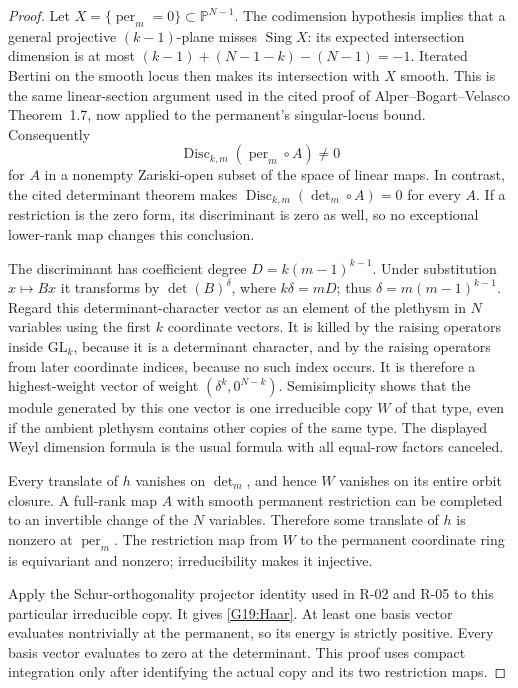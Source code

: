 \begin{proof}
Let $X=\{\operatorname{per}_m=0\}\subset\mathbb P^{N-1}$.
The codimension hypothesis implies that a general projective
$(k-1)$-plane misses $\operatorname{Sing}X$: its expected
intersection dimension is at most
$(k-1)+(N-1-k)-(N-1)=-1$.
Iterated Bertini on the smooth locus then makes its intersection
with $X$ smooth. This is the same linear-section argument used
in the cited proof of Alper--Bogart--Velasco Theorem~1.7, now
applied to the permanent's singular-locus bound. Consequently
\[
 \operatorname{Disc}_{k,m}(\operatorname{per}_m\circ A)\ne0
\]
for $A$ in a nonempty Zariski-open subset of the space of linear
maps. In contrast, the cited determinant theorem makes
$\operatorname{Disc}_{k,m}(\det_m\circ A)=0$ for every $A$.
If a restriction is the zero form, its discriminant is zero as
well, so no exceptional lower-rank map changes this conclusion.

The discriminant has coefficient degree $D=k(m-1)^{k-1}$.
Under substitution $x\mapsto Bx$ it transforms by
$\det(B)^\delta$, where $k\delta=mD$; thus
$\delta=m(m-1)^{k-1}$. Regard this determinant-character vector
as an element of the plethysm in $N$ variables using the first
$k$ coordinate vectors. It is killed by the raising operators
inside $\mathrm{GL}_k$, because it is a determinant character,
and by the raising operators from later coordinate indices,
because no such index occurs. It is therefore a highest-weight
vector of weight $(\delta^k,0^{N-k})$. Semisimplicity shows that
the module generated by this one vector is one irreducible copy
$W$ of that type, even if the ambient plethysm contains other
copies of the same type. The displayed Weyl dimension formula
is the usual formula with all equal-row factors canceled.

Every translate of $h$ vanishes on $\det_m$, and hence $W$
vanishes on its entire orbit closure. A full-rank map $A$ with
smooth permanent restriction can be completed to an invertible
change of the $N$ variables. Therefore some translate of $h$
is nonzero at $\operatorname{per}_m$. The restriction map from
$W$ to the permanent coordinate ring is equivariant and nonzero;
irreducibility makes it injective.

Apply the Schur-orthogonality projector identity used in R-02
and R-05 to this particular irreducible copy. It gives
\eqref{G19:Haar}. At least one basis vector evaluates nontrivially
at the permanent, so its energy is strictly positive. Every
basis vector evaluates to zero at the determinant. This proof
uses compact integration only after identifying the actual
copy and its two restriction maps.


\end{proof}
